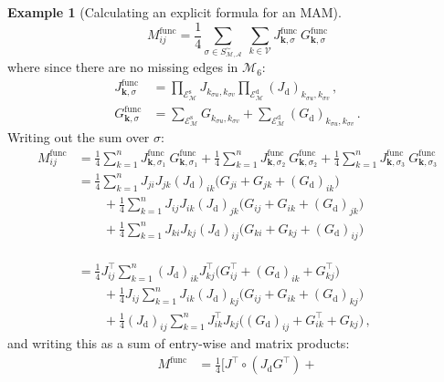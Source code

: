 \documentclass[12pt]{ociamthesis}
\theoremstyle{plain}
\theoremstyle{definition}
\newtheorem{example}{Example}[chapter]
\theoremstyle{remark}
\newcommand\ca[1]{\mathcal{#1}}
\begin{document}
\begin{example}[Calculating an explicit formula for an MAM]
$$
M^\mathrm{func}_{i j} = \frac{1}{4} \sum_{\sigma \in S_\ca{M,A}^\sim} \
\sum_{k \in \ca{V}} J^\mathrm{func}_{\mathbf{k},\sigma} \
G^\mathrm{func}_{\mathbf{k},\sigma}
$$
%
where since there are no missing edges in $\ca{M}_6$:
%
\begin{align*}
%
J^\mathrm{func}_{\mathbf{k},\sigma}
&= \prod_{\ca{E}_\ca{M}^\mathrm{s}} J_{k_{\sigma u},k_{\sigma v}}
\prod_{\ca{E}_\ca{M}^\mathrm{d}} (J_\mathrm{d})_{k_{\sigma u},k_{\sigma
v}}\,, \\
%
G^\mathrm{func}_{\mathbf{k},\sigma}
&= \sum_{\ca{E}_\ca{M}^\mathrm{s}} G_{k_{\sigma u},k_{\sigma v}}
+ \sum_{\ca{E}_\ca{M}^\mathrm{d}} (G_\mathrm{d})_{k_{\sigma u},k_{\sigma
v}}\,.
%
\end{align*}
%
Writing out the sum over $\sigma$:
%
\begingroup
\allowdisplaybreaks
\begin{align*}
M^\mathrm{func}_{i j}
&= \frac{1}{4} \sum_{k=1}^n J^\mathrm{func}_{\mathbf{k},\sigma_1} \
G^\mathrm{func}_{\mathbf{k},\sigma_1} + \frac{1}{4} \sum_{k=1}^n
J^\mathrm{func}_{\mathbf{k},\sigma_2} \
G^\mathrm{func}_{\mathbf{k},\sigma_2} + \frac{1}{4} \sum_{k=1}^n
J^\mathrm{func}_{\mathbf{k},\sigma_3} \
G^\mathrm{func}_{\mathbf{k},\sigma_3} \\
%
&=         \frac{1}{4} \sum_{k=1}^n J_{j i} J_{j k} (J_\mathrm{d})_{i k}
\big(G_{j i} + G_{j k} + (G_\mathrm{d})_{i k}\big) \\
& \qquad + \frac{1}{4} \sum_{k=1}^n J_{i j} J_{i k} (J_\mathrm{d})_{j k}
\big(G_{i j} + G_{i k} + (G_\mathrm{d})_{j k}\big) \\
& \qquad + \frac{1}{4} \sum_{k=1}^n J_{k i} J_{k j} (J_\mathrm{d})_{i j}
\big(G_{k i} + G_{k j} + (G_\mathrm{d})_{i j}\big) \\
%
& \\
& \\
& \\
&=         \frac{1}{4} J^\top_{i j} \sum_{k=1}^n (J_\mathrm{d})_{i k}
J^\top_{k j} \big(G^\top_{i j} + (G_\mathrm{d})_{i k} + G^\top_{k j}\big) \\
& \qquad + \frac{1}{4} J_{i j} \sum_{k=1}^n J_{i k}
(J_\mathrm{d})_{k j} \big(G_{i j} + G_{i k} + (G_\mathrm{d})_{k j}\big) \\
& \qquad + \frac{1}{4} (J_\mathrm{d})_{i j}
\sum_{k=1}^n J^\top_{i k} J_{k j}
\big((G_\mathrm{d})_{i j} + G^\top_{i k} + G_{k j}\big) \,,
\end{align*}
\endgroup
%
and writing this as a sum of entry-wise and matrix products:
%
\begin{align*}
M^\textrm{func} &= \frac{1}{4} \Big[ J^\top \circ (J_\mathrm{d} G^\top) +

\end{align*}
\end{example}
\end{document}
